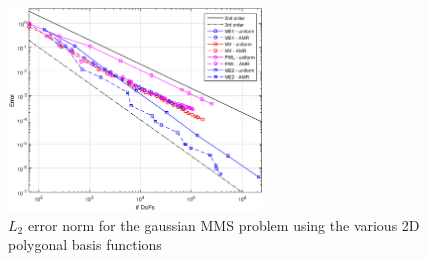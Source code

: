 \documentclass[11pt]{article}
\begin{document}
\begin{figure}[!hbt]
\centering
\includegraphics[width=0.6\textwidth]{figures/Transport_Gauss_2D_AMR_Error_Plot.eps}
\caption{$L_2$ error norm for the gaussian MMS problem using the various 2D polygonal basis functions }
\label{fig::Gauss_AMR_err}
\end{figure}
\end{document}
